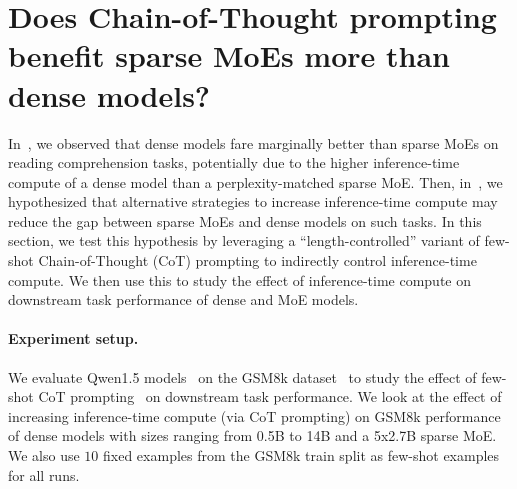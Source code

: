 \section{Does Chain-of-Thought prompting benefit sparse MoEs more than dense models?}
\label{app:cot_expt}

In~, we observed that dense models fare marginally better than sparse MoEs on reading comprehension tasks, potentially due to the higher inference-time compute of a dense model than a perplexity-matched sparse MoE. 
Then, in~, we hypothesized that alternative strategies to increase inference-time compute may reduce the gap between sparse MoEs and dense models on such tasks.
In this section, we test this hypothesis by leveraging a ``length-controlled'' variant of few-shot Chain-of-Thought (CoT) prompting to indirectly control inference-time compute. We then use this to study the effect of inference-time compute on downstream task performance of dense and MoE models.  

\paragraph{Experiment setup.}
We evaluate Qwen1.5 models~\citep{qwen} on the GSM8k dataset~\citep{cobbe2021gsm8k} to study the effect of few-shot CoT prompting~\citep{wei2022chain_cot} on downstream task performance. 
We look at the effect of increasing inference-time compute (via CoT prompting) on GSM8k performance of dense models with sizes ranging from 0.5B to 14B and a 5x2.7B sparse MoE. 
We also use $10$ fixed examples from the GSM8k train split as few-shot examples for all runs.

